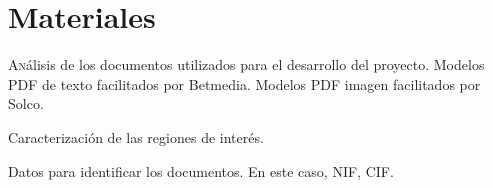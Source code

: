 
\chapter{Materiales}
\label{chap:materiales}

\lettrine{A}nálisis de los documentos utilizados para el desarrollo del proyecto. Modelos PDF de texto facilitados por Betmedia. Modelos PDF imagen facilitados por Solco.

Caracterización de las regiones de interés.

Datos para identificar los documentos. En este caso, NIF, CIF.
